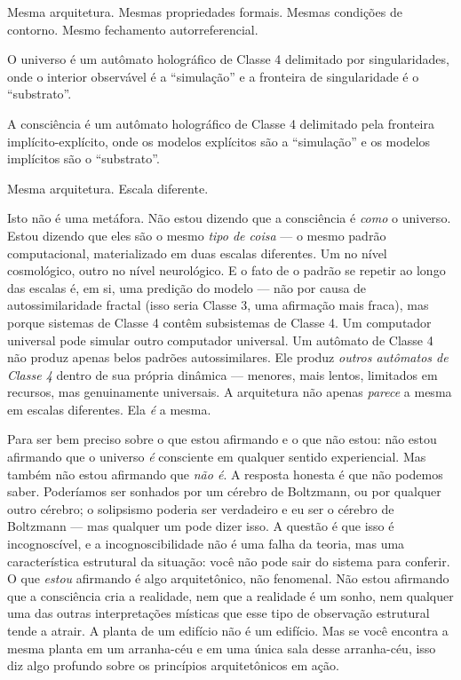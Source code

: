 \documentclass[11pt, twoside, openright]{book}
\begin{document}
Mesma arquitetura. Mesmas propriedades formais. Mesmas condições de contorno. Mesmo fechamento autorreferencial.

O universo é um autômato holográfico de Classe 4 delimitado por singularidades, onde o interior observável é a ``simulação'' e a fronteira de singularidade é o ``substrato''.

A consciência é um autômato holográfico de Classe 4 delimitado pela fronteira implícito-explícito, onde os modelos explícitos são a ``simulação'' e os modelos implícitos são o ``substrato''.

Mesma arquitetura. Escala diferente.

Isto não é uma metáfora. Não estou dizendo que a consciência é \textit{como} o universo. Estou dizendo que eles são o mesmo \textit{tipo de coisa} --- o mesmo padrão computacional, materializado em duas escalas diferentes. Um no nível cosmológico, outro no nível neurológico. E o fato de o padrão se repetir ao longo das escalas é, em si, uma predição do modelo --- não por causa de autossimilaridade fractal (isso seria Classe 3, uma afirmação mais fraca), mas porque sistemas de Classe 4 contêm subsistemas de Classe 4. Um computador universal pode simular outro computador universal. Um autômato de Classe 4 não produz apenas belos padrões autossimilares. Ele produz \textit{outros autômatos de Classe 4} dentro de sua própria dinâmica --- menores, mais lentos, limitados em recursos, mas genuinamente universais. A arquitetura não apenas \textit{parece} a mesma em escalas diferentes. Ela \textit{é} a mesma.

Para ser bem preciso sobre o que estou afirmando e o que não estou: não estou afirmando que o universo \textit{é} consciente em qualquer sentido experiencial. Mas também não estou afirmando que \textit{não é}. A resposta honesta é que não podemos saber. Poderíamos ser sonhados por um cérebro de Boltzmann, ou por qualquer outro cérebro; o solipsismo poderia ser verdadeiro e eu ser o cérebro de Boltzmann --- mas qualquer um pode dizer isso. A questão é que isso é incognoscível, e a incognoscibilidade não é uma falha da teoria, mas uma característica estrutural da situação: você não pode sair do sistema para conferir. O que \textit{estou} afirmando é algo arquitetônico, não fenomenal. Não estou afirmando que a consciência cria a realidade, nem que a realidade é um sonho, nem qualquer uma das outras interpretações místicas que esse tipo de observação estrutural tende a atrair. A planta de um edifício não é um edifício. Mas se você encontra a mesma planta em um arranha-céu e em uma única sala desse arranha-céu, isso diz algo profundo sobre os princípios arquitetônicos em ação.
\end{document}
